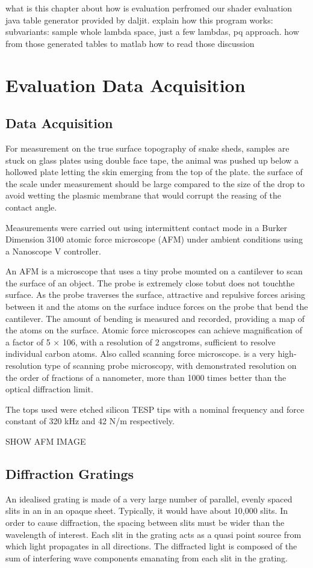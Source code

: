 what is this chapter about
how is evaluation perfromed
our shader
evaluation java table generator provided by daljit.
explain how this program works:
subvariants: sample whole lambda space, just a few lambdas, pq approach.
how from those generated tables to matlab
how to read those
discussion


\chapter{Evaluation Data Acquisition}
\section{Data Acquisition}
For measurement on the true surface topography of snake sheds, samples are stuck on glass plates using double face tape, the animal was pushed up below a hollowed plate letting the skin emerging from the top of the plate. the surface of the scale under measurement should be large compared to the size of the drop to avoid wetting the plasmic membrane that would corrupt the reasing of the contact angle. 

Measurements were carried out using intermittent contact mode in a Burker Dimension 3100 atomic force microscope (AFM) under ambient conditions using a Nanoscope V controller. 

An AFM is a microscope that uses a tiny probe mounted on a cantilever to scan the surface of an object. The probe is extremely close tobut does not touchthe surface. As the probe traverses the surface, attractive and repulsive forces arising between it and the atoms on the surface induce forces on the probe that bend the cantilever. The amount of bending is measured and recorded, providing a map of the atoms on the surface. Atomic force microscopes can achieve magnification of a factor of 5 × 106, with a resolution of 2 angstroms, sufficient to resolve individual carbon atoms. Also called scanning force microscope.
is a very high-resolution type of scanning probe microscopy, with demonstrated resolution on the order of fractions of a nanometer, more than 1000 times better than the optical diffraction limit.

The tops used were etched silicon TESP tips with a nominal frequency and force constant of 320 kHz and 42 N/m respectively. 

SHOW AFM IMAGE

\section{Diffraction Gratings}
An idealised grating is made of a very large number of parallel, evenly spaced slits in an in an opaque sheet. Typically, it would have about 10,000 slits. In order to cause diffraction, the spacing between slits must be wider than the wavelength of interest. Each slit in the grating acts as a quasi point source from which light propagates in all directions. The diffracted light is composed of the sum of interfering wave components emanating from each slit in the grating.

